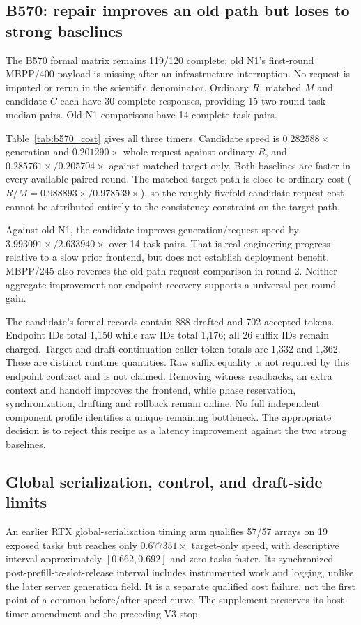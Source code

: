 \subsection{B570: repair improves an old path but loses to strong baselines}
The B570 formal matrix remains 119/120 complete: old N1's first-round MBPP/400 payload is missing after an infrastructure interruption. No request is imputed or rerun in the scientific denominator. Ordinary $R$, matched $M$ and candidate $C$ each have 30 complete responses, providing 15 two-round task-median pairs. Old-N1 comparisons have 14 complete task pairs.

Table~\ref{tab:b570_cost} gives all three timers. Candidate speed is $0.282588\times$ generation and $0.201290\times$ whole request against ordinary $R$, and $0.285761\times/0.205704\times$ against matched target-only. Both baselines are faster in every available paired round. The matched target path is close to ordinary cost ($R/M=0.988893\times/0.978539\times$), so the roughly fivefold candidate request cost cannot be attributed entirely to the consistency constraint on the target path.



Against old N1, the candidate improves generation/request speed by $3.993091\times/2.633940\times$ over 14 task pairs. That is real engineering progress relative to a slow prior frontend, but does not establish deployment benefit. MBPP/245 also reverses the old-path request comparison in round 2. Neither aggregate improvement nor endpoint recovery supports a universal per-round gain.

The candidate's formal records contain 888 drafted and 702 accepted tokens. Endpoint IDs total 1,150 while raw IDs total 1,176; all 26 suffix IDs remain charged. Target and draft continuation caller-token totals are 1,332 and 1,362. These are distinct runtime quantities. Raw suffix equality is not required by this endpoint contract and is not claimed. Removing witness readbacks, an extra context and handoff improves the frontend, while phase reservation, synchronization, drafting and rollback remain online. No full independent component profile identifies a unique remaining bottleneck. The appropriate decision is to reject this recipe as a latency improvement against the two strong baselines.

\subsection{Global serialization, control, and draft-side limits}
An earlier RTX global-serialization timing arm qualifies 57/57 arrays on 19 exposed tasks but reaches only $0.677351\times$ target-only speed, with descriptive interval approximately $[0.662,0.692]$ and zero tasks faster. Its synchronized post-prefill-to-slot-release interval includes instrumented work and logging, unlike the later server generation field. It is a separate qualified cost failure, not the first point of a common before/after speed curve. The supplement preserves its host-timer amendment and the preceding V3 stop.

